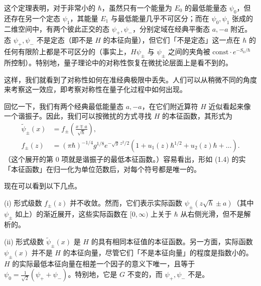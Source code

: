 这个定理表明，对于非常小的 $\hbar$，虽然只有一个能量为 $E_0$ 的最低能量态 $\psi_0$，但还存在另一个定态 $\psi_1$，其能量 $E_1$ 与最低能量几乎不可区分；而在 $\psi_0,\psi_1$ 张成的二维空间中，有两个彼此正交的态 $\psi_+,\psi_-$，分别定域在经典平衡态 $a,-a$ 附近。态 $\psi_+,\psi_-$ 不是定态（即不是 $H$ 的本征向量），但它们「不是定态」这一点在 $\hbar$ 的任何有限阶上都是不可区分的（事实上，$H\psi_\pm$ 与 $\psi_\pm$ 之间的夹角被 $\mathrm{const}\cdot e^{-S_0/\hbar}$ 所控制）。特别地，量子理论中的对称性恢复在微扰论层面上是看不到的。

这样，我们就看到了对称性如何在准经典极限中丢失。人们可以从稍微不同的角度来考察这一效应，即考察对称性在量子化过程中如何出现。

回忆一下，我们有两个经典最低能量态 $a,-a$，在它们附近算符 $H$ 近似看起来像一个谐振子。因此，我们可以按微扰的方式寻找 $H$ 的本征函数，其形式为
\begin{equation}
  \tag{1.4}
  \label{eq:1-4}
  \begin{aligned}
    \widetilde{\psi}_\pm(x)&=f_\pm\left(\frac{x\mp a}{\sqrt{\hbar}}\right),\\
    f_\pm(z)&=(\pi\hbar)^{-1/4}g^{1/8}e^{-\sqrt{g}\,z^2/2}
      \left(1+u_1(z)\hbar^{1/2}+u_2(z)\hbar+\dots\right).
  \end{aligned}
\end{equation}
（这个展开的第 0 项就是谐振子的最低本征函数。）容易看出，形如 (1.4) 的实「本征函数」在归一化为单位范数后，对每个符号都是唯一的。


现在可以看到以下几点。

(i) 形式级数 $f_\pm(z)$ 并不收敛。然而，它们表示实际函数 $\psi_\pm(z\sqrt{\hbar}\pm a)$（其中 $\psi_\pm$ 如上）的渐近展开，这些实际函数在 $[0,\infty)$ 上关于 $\hbar$ 从右侧光滑，但不是解析的。

(ii) 形式级数 $\widetilde{\psi}_\pm(x)$ 是 $H$ 的具有相同本征值的本征函数。另一方面，实际函数 $\psi_\pm(x)$ 并不是 $H$ 的本征向量，尽管它们「不是本征向量」的程度是指数小的。$H$ 的实际最低本征向量在相差一个因子的意义下唯一，且等于 $\psi_0=\frac{1}{\sqrt2}(\psi_++\psi_-)$。特别地，它是 $G$ 不变的，而 $\psi_+,\psi_-$ 不是。

